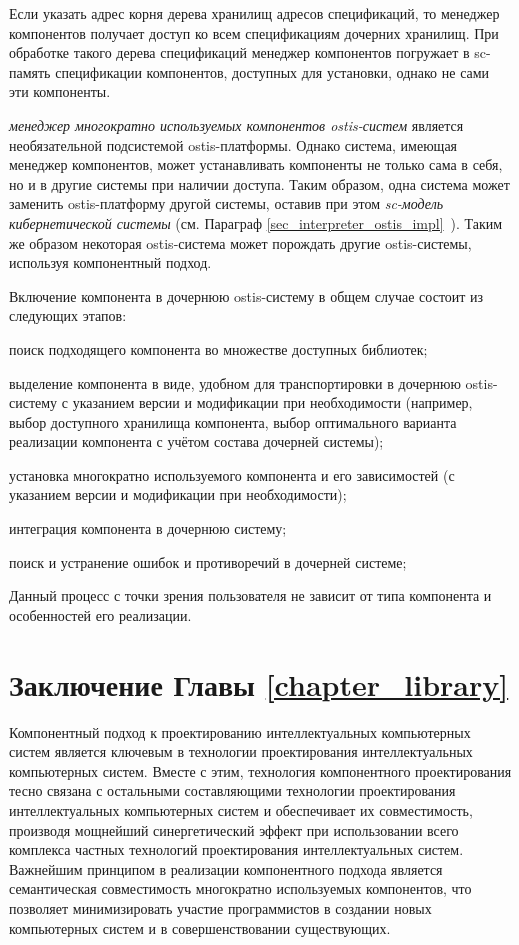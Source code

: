 Если указать адрес корня дерева хранилищ адресов спецификаций, то менеджер компонентов получает доступ ко всем спецификациям дочерних хранилищ. При обработке такого дерева спецификаций менеджер компонентов погружает в sc-память спецификации компонентов, доступных для установки, однако не сами эти компоненты.

\textit{менеджер многократно используемых компонентов ostis-систем} является необязательной подсистемой ostis-платформы. Однако система, имеющая менеджер компонентов, может устанавливать компоненты не только сама в себя, но и в другие системы при наличии доступа. Таким образом, одна система может заменить ostis-платформу другой системы, оставив при этом \textit{sc-модель кибернетической системы} (см. Параграф \ref{sec_interpreter_ostis_impl}~). Таким же образом некоторая ostis-система может порождать другие ostis-системы, используя компонентный подход.

Включение компонента в дочернюю ostis-систему в общем случае состоит из следующих этапов:
\begin{textitemize}
	\item поиск подходящего компонента во множестве доступных библиотек;
	\item выделение компонента в виде, удобном для транспортировки в дочернюю ostis-систему с указанием версии и модификации при необходимости (например, выбор доступного хранилища компонента, выбор оптимального варианта реализации компонента с учётом состава дочерней системы);
	\item установка многократно используемого компонента и его зависимостей (с указанием версии и модификации при необходимости);
	\item интеграция компонента в дочернюю систему;
	\item поиск и устранение ошибок и противоречий в дочерней системе;
\end{textitemize}

Данный процесс с точки зрения пользователя не зависит от типа компонента и особенностей его реализации.

\section*{Заключение Главы \ref{chapter_library}}
\label{ostis_library_conclusion}

Компонентный подход к проектированию интеллектуальных компьютерных систем является ключевым в технологии проектирования интеллектуальных компьютерных систем. Вместе с этим, технология компонентного проектирования тесно связана с остальными составляющими технологии проектирования интеллектуальных компьютерных систем и обеспечивает их совместимость, производя мощнейший синергетический эффект при использовании всего комплекса частных технологий проектирования интеллектуальных систем. Важнейшим принципом в реализации компонентного подхода является семантическая совместимость многократно используемых компонентов, что позволяет минимизировать участие программистов в создании новых компьютерных систем и в совершенствовании существующих.

